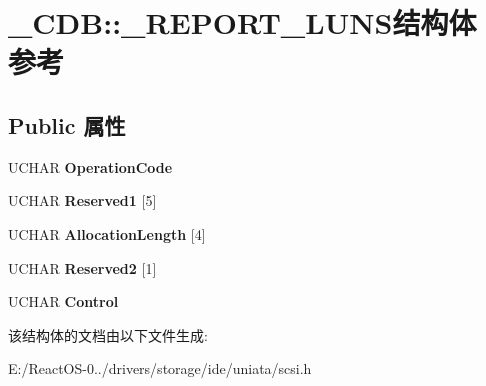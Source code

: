 \hypertarget{struct___c_d_b_1_1___r_e_p_o_r_t___l_u_n_s}{}\section{\+\_\+\+C\+DB\+:\+:\+\_\+\+R\+E\+P\+O\+R\+T\+\_\+\+L\+U\+N\+S结构体 参考}
\label{struct___c_d_b_1_1___r_e_p_o_r_t___l_u_n_s}
\subsection*{Public 属性}
\begin{DoxyCompactItemize}
\item 
\mbox{\label{struct___c_d_b_1_1___r_e_p_o_r_t___l_u_n_s_abbd9d95229bcf4453fb0bee9ddd1e521}} 
U\+C\+H\+AR {\bfseries Operation\+Code}
\item 
\mbox{\label{struct___c_d_b_1_1___r_e_p_o_r_t___l_u_n_s_a89ed4319cffda369679a8f0a1f74bc5a}} 
U\+C\+H\+AR {\bfseries Reserved1} \mbox{[}5\mbox{]}
\item 
\mbox{\label{struct___c_d_b_1_1___r_e_p_o_r_t___l_u_n_s_a0d5a71ea796ea95bb3f3b1221941f9a0}} 
U\+C\+H\+AR {\bfseries Allocation\+Length} \mbox{[}4\mbox{]}
\item 
\mbox{\label{struct___c_d_b_1_1___r_e_p_o_r_t___l_u_n_s_a4373d082633e0b3281b77b54e3a776a2}} 
U\+C\+H\+AR {\bfseries Reserved2} \mbox{[}1\mbox{]}
\item 
\mbox{\label{struct___c_d_b_1_1___r_e_p_o_r_t___l_u_n_s_a95d27fd4160646b39b7ef2667880c153}} 
U\+C\+H\+AR {\bfseries Control}
\end{DoxyCompactItemize}


该结构体的文档由以下文件生成\+:\begin{DoxyCompactItemize}
\item 
E\+:/\+React\+O\+S-\/0../drivers/storage/ide/uniata/scsi.\+h\end{DoxyCompactItemize}
